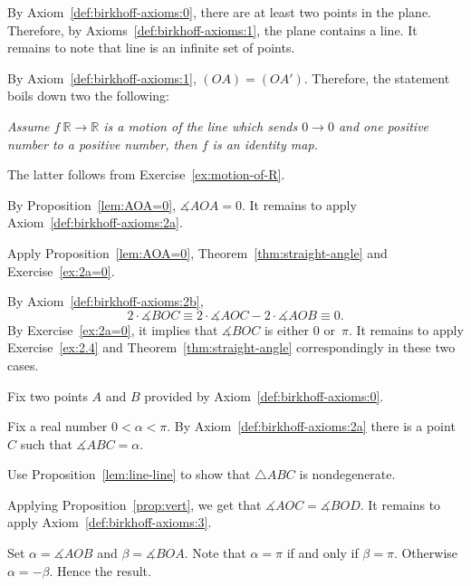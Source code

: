  By Axiom~\ref{def:birkhoff-axioms:0}, there are at least two points in the plane.
Therefore, by Axioms~\ref{def:birkhoff-axioms:1}, 
the plane contains a line. 
It remains to note that line is an infinite set of points.

\parbf{Exercise~\ref{ex:[OA)=[OA')}.}
By Axiom~\ref{def:birkhoff-axioms:1},
$(OA)=(OA')$.
Therefore, the statement boils down two the following:

\textit{Assume $f\:\mathbb{R}\to \mathbb{R}$ is a motion of the line which sends $0\to 0$ and one positive number to a positive number, then $f$ is an identity map.}

The latter follows from Exercise~\ref{ex:motion-of-R}.

By Proposition~\ref{lem:AOA=0},
$\measuredangle AOA=0$.
It remains to apply Axiom~\ref{def:birkhoff-axioms:2a}.

Apply Proposition~\ref{lem:AOA=0},
Theorem~\ref{thm:straight-angle} 
and Exercise~\ref{ex:2a=0}.

By Axiom~\ref{def:birkhoff-axioms:2b},
$$2\cdot\measuredangle BOC
\equiv 
2\cdot\measuredangle AOC-2\cdot \measuredangle AOB
\equiv 0.$$
By Exercise~\ref{ex:2a=0}, 
it implies that 
$\measuredangle BOC$ is either $0$ or~$\pi$.
It remains to apply Exercise~\ref{ex:2.4} and Theorem~\ref{thm:straight-angle} correspondingly in these two cases.

Fix two points $A$ and $B$ provided by Axiom~\ref{def:birkhoff-axioms:0}.

Fix a real number $0<\alpha<\pi$.
By Axiom~\ref{def:birkhoff-axioms:2a} there is a point $C$ such that $\measuredangle ABC=\alpha$.

Use Proposition~\ref{lem:line-line} to show that $\triangle ABC$ is nondegenerate.

Applying Proposition~\ref{prop:vert}, we get that
$\measuredangle AOC= \measuredangle BOD$.
It remains to apply Axiom~\ref{def:birkhoff-axioms:3}.

\setcounter{eqtn}{0}

Set $\alpha=\measuredangle AOB$ 
and 
$\beta=\measuredangle BOA$.
Note that $\alpha=\pi$ if and only if $\beta=\pi$.
Otherwise $\alpha=-\beta$.
Hence the result.

